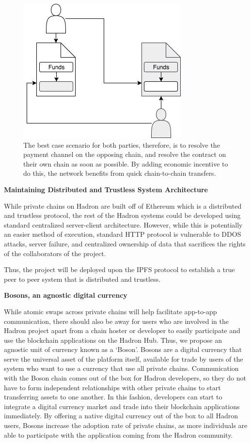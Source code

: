 \documentclass{%
	article}
\begin{document}
\begin{figure}[htbp!]
\centering
\includegraphics[scale=0.5]{fig6.jpg}
\caption{The best case scenario for both parties, therefore, is to resolve the payment channel on the opposing chain, and resolve the contract on their own chain as soon as possible. By adding economic incentive to do this, the network benefits from quick chain-to-chain transfers.}
\end{figure}


\begin{center}
\textbf{Maintaining Distributed and Trustless System Architecture}
\end{center}

While private chains on Hadron are built off of Ethereum which is a distributed and trustless protocol, the rest of the Hadron systems could be developed using standard centralized server-client architecture. However, while this is potentially an easier method of execution, standard HTTP protocol is vulnerable to DDOS attacks, server failure, and centralized ownership of data that sacrifices the rights of the collaborators of the project.

Thus, the project will be deployed upon the IPFS protocol to establish a true peer to peer system that is distributed and trustless.

\begin{center}
\textbf{Bosons, an agnostic digital currency}
\end{center}

While atomic swaps across private chains will help facilitate app-to-app communication, there should also be away for users who are involved in the Hadron project apart from a chain hoster or developer to easily participate and use the blockchain applications on the Hadron Hub. Thus, we propose an agnostic unit of currency known as a ‘Boson’. Bosons are a digital currency that serve the universal asset of the platform itself, available for trade by users of the system who want to use a currency that use all private chains. Communication with the Boson chain comes out of the box for Hadron developers, so they do not have to form independent relationships with other private chains to start transferring assets to one another. In this fashion, developers can start to integrate a digital currency market and trade into their blockchain applications immediately. By offering a native digital currency out of the box to all Hadron users, Bosons increase the adoption rate of private chains, as more individuals are able to participate with the application coming from the Hadron community.
\end{document}

